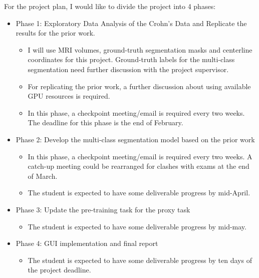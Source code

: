 For the project plan, I would like to divide the project into 4 phases:
\begin{itemize}
    \item Phase 1: Exploratory Data Analysis of the Crohn's Data and Replicate the results for the prior work.
    \begin{itemize}
        \item I will use MRI volumes, ground-truth segmentation masks and centerline coordinates for this project. Ground-truth labels for the multi-class segmentation need further discussion with the project supervisor.
        \item For replicating the prior work, a further discussion about using available GPU resources is required.
        \item In this phase, a checkpoint meeting/email is required every two weeks. The deadline for this phase is the end of February.
    \end{itemize}
    
    \item Phase 2: Develop the multi-class segmentation model based on the prior work
    \begin{itemize}
        \item In this phase, a checkpoint meeting/email is required every two weeks. A catch-up meeting could be rearranged for clashes with exams at the end of March. 
        \item The student is expected to have some deliverable progress by mid-April.
    \end{itemize}
    \item Phase 3: Update the pre-training task for the proxy task
    \begin{itemize}
        \item The student is expected to have some deliverable progress by mid-may.
    \end{itemize}
    \item Phase 4: GUI implementation and final report
    \begin{itemize}
        \item The student is expected to have some deliverable progress by ten days of the project deadline.
    \end{itemize}
\end{itemize}